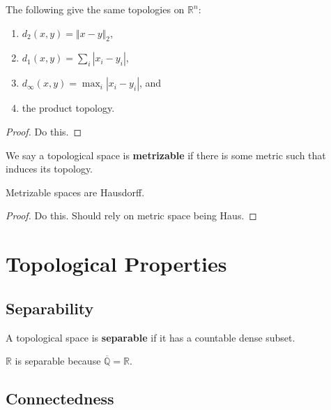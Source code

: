 \documentclass[10pt]{report}
\begin{document}
\begin{prop}
The following give the same topologies on $\mathbb{R}^n$:
\begin{enumerate}
	\item $d_2(x,y) = {\Vert{x-y}\Vert}_{2}$,
	\item $d_1(x,y)=\sum_i |x_i-y_i|$,
	\item $d_{\infty}(x,y) = \max_{i}|x_i-y_i|$, and
	\item the product topology.
\end{enumerate}
\end{prop}
\begin{proof}
	{\color{red}Do this.}
\end{proof}

We say a topological space is \textbf{metrizable} if there is some metric such that induces its topology.

\begin{prop}
Metrizable spaces are Hausdorff.
\end{prop}
\begin{proof}
	{\color{red}Do this. Should rely on metric space being Haus.}
\end{proof}


\chapter{Topological Properties}


\section{Separability}

\begin{defn}[]
A topological space is \textbf{separable} if it has a countable dense subset.
\end{defn}

\begin{ex}[]
$\mathbb{R}$ is separable because $\overline{\mathbb{Q}} =\mathbb{R}$.
\end{ex}



\section{Connectedness}
\end{document}
